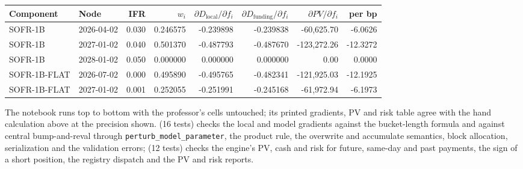 \documentclass[10pt]{article}
\newcommand{\code}[1]{\texttt{#1}}
\begin{document}
\begin{center}\small\setlength{\tabcolsep}{5pt}
\begin{tabular}{@{}llrrrrrr@{}}\toprule
Component & Node & IFR & $w_i$ & $\partial D_{\mathrm{local}}/\partial f_i$ & $\partial D_{\mathrm{funding}}/\partial f_i$ & $\partial PV/\partial f_i$ & per bp\\ \midrule
SOFR-1B & 2026-04-02 & 0.030 & 0.246575 & -0.239898 & -0.239838 & -60,625.70 & -6.0626 \\
SOFR-1B & 2027-01-02 & 0.040 & 0.501370 & -0.487793 & -0.487670 & -123,272.26 & -12.3272 \\
SOFR-1B & 2028-01-02 & 0.050 & 0.000000 & 0.000000 & 0.000000 & 0.00 & 0.0000 \\
SOFR-1B-FLAT & 2026-07-02 & 0.000 & 0.495890 & -0.495765 & -0.482341 & -121,925.03 & -12.1925 \\
SOFR-1B-FLAT & 2027-01-02 & 0.001 & 0.252055 & -0.251991 & -0.245168 & -61,972.94 & -6.1973 \\
\bottomrule\end{tabular}\end{center}

The notebook runs top to bottom with the professor's cells untouched; its printed gradients, PV and risk table agree with the hand
calculation above at the precision shown.  (16 tests) checks the
local and model gradients against the bucket-length formula and against central bump-and-reval through
\code{perturb\_model\_parameter}, the product rule, the overwrite and accumulate semantics, block allocation, serialization and the
validation errors;  (12 tests) checks the engine's PV, cash and risk for future,
same-day and past payments, the sign of a short position, the registry dispatch and the PV and risk reports.
\end{document}
